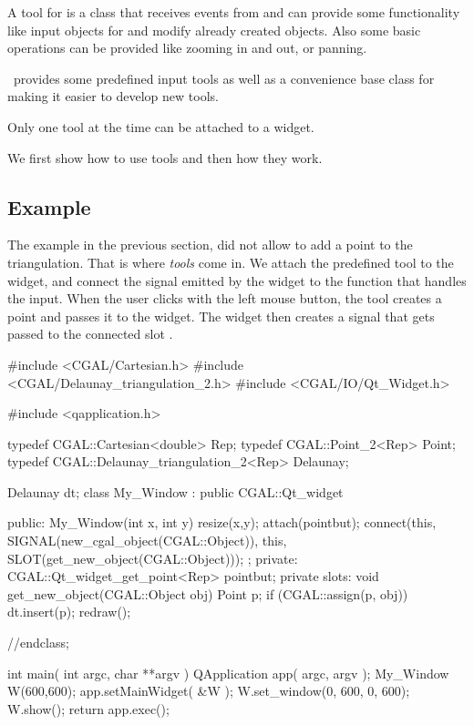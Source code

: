 A tool for  is a class that receives events from
 and can provide some functionality like input
objects for  and modify already created
objects. Also some basic operations can be provided like zooming in
and out, or panning.

\cgal\ provides some predefined input tools as well as a convenience base class 
 for making it easier to develop new tools.

Only one tool at the time can be attached to a widget.

We first show how to use tools and then how they work.

\subsection{Example}

The example in the previous section, did not allow to add a point to the triangulation.
That is where {\em  tools} come in. We attach the predefined tool 
to the widget, and connect the signal emitted by the widget to the function that 
handles the input.  When the user clicks with the left mouse button, the tool creates
a point and passes it to the widget. The widget then creates a signal that gets passed
to the connected slot .

\begin{ccExampleCode}
#include <CGAL/Cartesian.h>
#include <CGAL/Delaunay_triangulation_2.h>
#include <CGAL/IO/Qt_Widget.h>

#include <qapplication.h>

typedef CGAL::Cartesian<double>		    Rep;
typedef CGAL::Point_2<Rep>		    Point;
typedef CGAL::Delaunay_triangulation_2<Rep> Delaunay;

Delaunay dt;
class My_Window : public CGAL::Qt_widget {
public:
  My_Window(int x, int y){
    resize(x,y);
    attach(pointbut);
    connect(this, SIGNAL(new_cgal_object(CGAL::Object)), 
            this, SLOT(get_new_object(CGAL::Object)));
  };
private:
  CGAL::Qt_widget_get_point<Rep> pointbut;   
private slots:
  void get_new_object(CGAL::Object obj)
  {
    Point p;
    if (CGAL::assign(p, obj)) { 
      dt.insert(p);
    }
    redraw();
  }

}//endclass;

int main( int argc, char **argv )
{
    QApplication app( argc, argv );
    My_Window W(600,600);
    app.setMainWidget( &W );
    W.set_window(0, 600, 0, 600);
    W.show();
    return app.exec();
}
\end{ccExampleCode}

